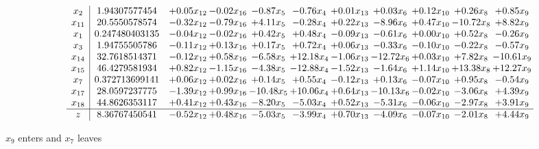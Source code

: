 \documentclass[9pt]{article}
\begin{document}
 \[\begin{array}{c| c c@{\hskip 2pt} c@{\hskip 2pt} c@{\hskip 2pt} c@{\hskip 2pt} c@{\hskip 2pt} c@{\hskip 2pt} c@{\hskip 2pt} c@{\hskip 2pt} c@{\hskip 2pt} }
 x_{2}   &  1.94307577454 & +  0.05 x_{12} & -0.02 x_{16} & -0.87 x_{5} & -0.76 x_{4} & +  0.01 x_{13} & +  0.03 x_{6} & +  0.12 x_{10} & +  0.26 x_{8} & +  0.85 x_{9}\\
 x_{11}   &  20.5550578574 & -0.32 x_{12} & -0.79 x_{16} & +  4.11 x_{5} & -0.28 x_{4} & +  0.22 x_{13} & -8.96 x_{6} & +  0.47 x_{10} & -10.72 x_{8} & +  8.82 x_{9}\\
 x_{1}   &  0.247480403135 & -0.04 x_{12} & -0.02 x_{16} & +  0.42 x_{5} & +  0.48 x_{4} & -0.09 x_{13} & -0.61 x_{6} & +  0.00 x_{10} & +  0.52 x_{8} & -0.26 x_{9}\\
 x_{3}   &  1.94755505786 & -0.11 x_{12} & +  0.13 x_{16} & +  0.17 x_{5} & +  0.72 x_{4} & +  0.06 x_{13} & -0.33 x_{6} & -0.10 x_{10} & -0.22 x_{8} & -0.57 x_{9}\\
 x_{14}   &  32.7618514371 & -0.12 x_{12} & +  0.58 x_{16} & -6.58 x_{5} & + 12.18 x_{4} & -1.06 x_{13} & -12.72 x_{6} & +  0.03 x_{10} & +  7.82 x_{8} & -10.61 x_{9}\\
 x_{15}   &  46.4279581934 & +  0.82 x_{12} & -1.15 x_{16} & -4.38 x_{5} & -12.88 x_{4} & -1.52 x_{13} & -1.64 x_{6} & +  1.14 x_{10} & + 13.38 x_{8} & + 12.27 x_{9}\\
 x_{7}   &  0.372713699141 & +  0.06 x_{12} & +  0.02 x_{16} & +  0.14 x_{5} & +  0.55 x_{4} & -0.12 x_{13} & +  0.13 x_{6} & -0.07 x_{10} & +  0.95 x_{8} & -0.54 x_{9}\\
 x_{17}   &  28.0597237775 & -1.39 x_{12} & +  0.99 x_{16} & -10.48 x_{5} & + 10.06 x_{4} & +  0.64 x_{13} & -10.13 x_{6} & -0.02 x_{10} & -3.06 x_{8} & +  4.39 x_{9}\\
 x_{18}   &  44.8626353117 & +  0.41 x_{12} & +  0.43 x_{16} & -8.20 x_{5} & -5.03 x_{4} & +  0.52 x_{13} & -5.31 x_{6} & -0.06 x_{10} & -2.97 x_{8} & +  3.91 x_{9}\\
\hline
z    &  8.36767450541 & -0.52 x_{12} & +  0.48 x_{16} & -5.03 x_{5} & -3.99 x_{4} & +  0.70 x_{13} & -4.09 x_{6} & -0.07 x_{10} & -2.01 x_{8} & +  4.44 x_{9}\\
\end{array}\]


 $ x_{9} $ enters and $ x_{7} $ leaves 
\end{document}

